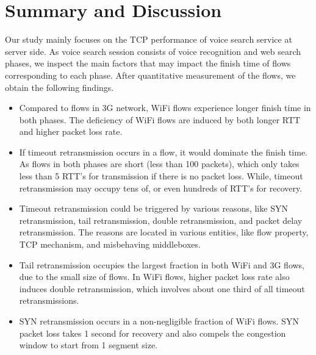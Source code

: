 
\section{Summary and Discussion}
\label{sec:discuss}

Our study mainly focuses on the TCP performance of voice search service at server side. As voice search session consists of voice recognition and web search phases, we inspect the main factors that may impact the finish time of flows corresponding to each phase. After quantitative measurement of the flows, we obtain the following findings.

\begin{itemize}
	\item Compared to flows in 3G network, WiFi flows experience longer finish time in both phases. The deficiency of WiFi flows are induced by both longer RTT and higher packet loss rate.
	\item If timeout retransmission occurs in a flow, it would dominate the finish time. As flows in both phases are short (less than 100 packets), which only takes less than 5  RTT's for transmission if there is no packet loss. While, timeout retransmission may occupy tens of, or even hundreds of RTT's for recovery.
	\item Timeout retransmission could be triggered by various reasons, like SYN retransmission, tail retransmission, double retransmission, and packet delay retransmission. The reasons are located in various entities, like flow property, TCP mechanism, and misbehaving middleboxes.
	\item Tail retransmission occupies the largest fraction in both WiFi and 3G flows, due to the small size of flows. In WiFi flows, higher packet loss rate also induces double retransmission, which involves about one third of all timeout retransmissions.
	\item SYN retransmission occurs in a non-negligible fraction of WiFi flows. SYN packet loss takes 1 second for recovery and also compels the congestion window to start from 1 segment size.
\end{itemize}

